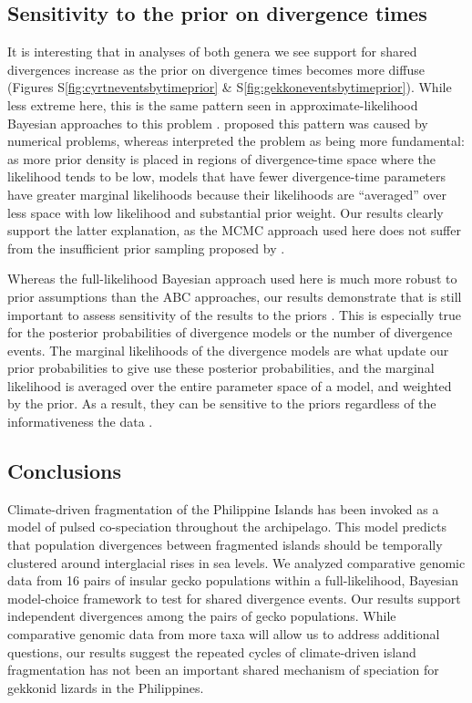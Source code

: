 \subsection{Sensitivity to the prior on divergence times}

It is interesting that in analyses of both genera we see support for shared
divergences increase as the prior on divergence times becomes more diffuse
(Figures
S\ref{fig:cyrtneventsbytimeprior}
\&
S\ref{fig:gekkoneventsbytimeprior}).
While less extreme here, this is the same pattern seen in
approximate-likelihood Bayesian approaches to this problem
\citep{Oaks2012,Hickerson2013,Oaks2014reply}.
\citet{Hickerson2013} proposed this pattern was caused by numerical problems,
whereas \citet{Oaks2014reply} interpreted the problem as being more
fundamental:
as more prior density is placed in regions of divergence-time space where the
likelihood tends to be low, models that have fewer divergence-time parameters
have greater marginal likelihoods because their likelihoods are ``averaged''
over less space with low likelihood and substantial prior weight.
Our results clearly support the latter explanation, as the MCMC approach used
here does not suffer from the insufficient prior sampling proposed by
\citet{Hickerson2013}.

Whereas the full-likelihood Bayesian approach used here is much more robust to
prior assumptions than the ABC approaches, our results demonstrate that is
still important to assess sensitivity of the results to the priors
\citep{Oaks2012}.
This is especially true for the posterior probabilities of divergence models or
the number of divergence events.
The marginal likelihoods of the divergence models are what update our prior
probabilities to give use these posterior probabilities, and the marginal
likelihood is averaged over the entire parameter space of a model, and weighted
by the prior.
As a result, they can be sensitive to the priors regardless of the
informativeness the data \citep{Oaks2018marginal}.

\subsection{Conclusions}
Climate-driven fragmentation of the Philippine Islands has been invoked as a
model of pulsed co-speciation throughout the archipelago.
This model predicts that population divergences between fragmented islands
should be temporally clustered around interglacial rises in sea levels.
We analyzed comparative genomic data from 16 pairs of insular gecko populations
within a full-likelihood, Bayesian model-choice framework to test for shared
divergence events.
Our results support independent divergences among the pairs of gecko
populations.
While comparative genomic data from more taxa will allow us to address
additional questions, our results suggest the repeated cycles of climate-driven
island fragmentation has not been an important shared mechanism of speciation
for gekkonid lizards in the Philippines.
